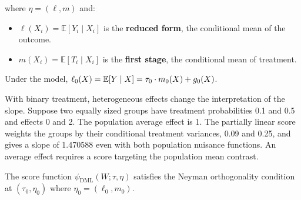 where \(\eta = (\ell, m)\) and:

\begin{itemize}
\item
  \(\ell(X_i) = \mathbb{E}[Y_i \mid X_i]\) is the \textbf{reduced form}, the conditional mean of the outcome.
\item
  \(m(X_i) = \mathbb{E}[T_i \mid X_i]\) is the \textbf{first stage}, the conditional mean of treatment.
\end{itemize}

Under the model, $\ell_0(X) = \mathbb{E}[Y \mid X] = \tau_0 \cdot m_0(X) + g_0(X)$.

With binary treatment, heterogeneous effects change the interpretation of the slope. Suppose two equally sized groups have treatment probabilities 0.1 and 0.5 and effects 0 and 2. The population average effect is 1. The partially linear score weights the groups by their conditional treatment variances, 0.09 and 0.25, and gives a slope of 1.470588 even with both population nuisance functions. An average effect requires a score targeting the population mean contrast.

\begin{theorem}
\label{thm:dml_orthogonality}
%
The score function $\psi_{\text{DML}}(W; \tau, \eta)$ satisfies the
Neyman orthogonality condition at $(\tau_0, \eta_0)$ where
$\eta_0 = (\ell_0, m_0)$.
\end{theorem}

